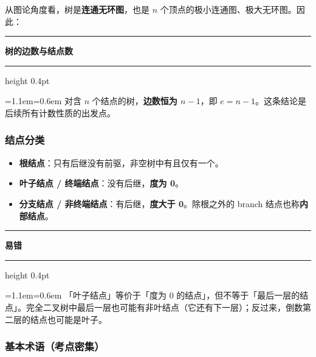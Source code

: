 \documentclass[11pt,openany,UTF8]{ctexbook}
\newcommand{\callouthead}[2]{%
  \par\addvspace{7pt}\noindent
  {\color{#1}\rule[-0.15em]{3pt}{1.05em}}\hspace{0.5em}%
  {\bfseries\color{#1}#2}\par\nobreak\vspace{-0.35em}%
  {\color{rulesep}\hrule height 0.4pt}\nobreak\vspace{0.45em}%
  \begingroup\small\setlength{\parindent}{0pt}%
  \leftskip=1.1em\rightskip=0.6em\noindent\ignorespaces}
\newcommand{\calloutend}{\par\endgroup\addvspace{7pt}}
\newenvironment{callkey}[1]{\callouthead{keybar}{#1}}{\calloutend}
\newenvironment{callwarn}[1]{\callouthead{warnbar}{#1}}{\calloutend}
\begin{document}
从图论角度看，树是\textbf{连通无环图}，也是 $n$ 个顶点的极小连通图、极大无环图。因此：

\begin{callkey}{树的边数与结点数}
对含 $n$ 个结点的树，\textbf{边数恒为 $n-1$}，即 $e=n-1$。这条结论是后续所有计数性质的出发点。

\end{callkey}

\subsubsection{结点分类}

\begin{itemize}
\item \textbf{根结点}：只有后继没有前驱，非空树中有且仅有一个。
\item \textbf{叶子结点 / 终端结点}：没有后继，\textbf{度为 0}。
\item \textbf{分支结点 / 非终端结点}：有后继，\textbf{度大于 0}。除根之外的 branch 结点也称\textbf{内部结点}。
\end{itemize}
\begin{callwarn}{易错}
「叶子结点」等价于「度为 0 的结点」，但不等于「最后一层的结点」。完全二叉树中最后一层也可能有非叶结点（它还有下一层）；反过来，倒数第二层的结点也可能是叶子。

\end{callwarn}

\subsubsection{基本术语（考点密集）}
\end{document}
